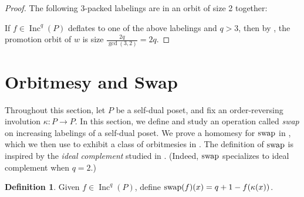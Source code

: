 \documentclass[11pt]{amsart}
\theoremstyle{definition}
\newtheorem{definition}[theorem]{Definition}
\DeclareMathOperator{\Inc}{\mathrm{Inc}}
\newcommand{\swap}{\textnormal{swap}}
\begin{document}
\begin{proof}
The following 3-packed labelings are in an orbit of size 2 together:
\begin{center}

\end{center}

If $f \in \Inc^q(P)$ deflates to one of the above labelings and $q>3$, then by , the promotion orbit of $w$ is size $\frac{2q}{\gcd(3,2)}=2q$.
\end{proof}
\section{Orbitmesy and Swap}
\label{sec:swap}


Throughout this section, let $P$ be a self-dual poset, and fix an order-reversing involution $\kappa: P \to P$. In this section, we define and study an operation called \emph{swap} on increasing labelings of a self-dual poset. We prove a homomesy for $\swap$ in , which we then use to exhibit a class of orbitmesies in . The definition of $\swap$ is inspired by the  \emph{ideal complement} studied in \cite[p.4]{elizalde2021rowmotion}.  (Indeed, $\swap$ specializes to  ideal complement when $q=2$.)

\begin{definition}
  Given $f \in \Inc^q(P)$, define $\swap(f)(x) = q+1 - f(\kappa(x))$.  
\end{definition}
\end{document}
